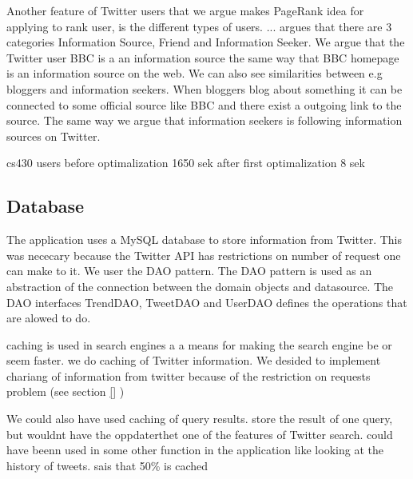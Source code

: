 Another feature of Twitter users that we argue makes PageRank idea for applying to rank user, is the different types of users.  ... argues that there are 3 categories Information Source, Friend and Information Seeker. We argue that the Twitter user BBC is a an information source the same way that BBC homepage is an information source on the web. We can also see similarities between e.g bloggers and information seekers. When bloggers blog about something it can be connected to some official source like BBC and there exist a outgoing link to the source. The same way we argue that information seekers is following information sources on Twitter.


cs430 users 
before optimalization
1650 sek
after first optimalization
8 sek

\subsection{Database} %
\label{feedJamDatabase}
The application uses a MySQL database to store information from Twitter. This was nececary because the Twitter API has restrictions on number of request one can make to it.
We user the DAO pattern. The DAO pattern is used as an abstraction of the connection between the domain objects and datasource. The DAO interfaces TrendDAO, TweetDAO and UserDAO defines the operations that are alowed to do.  


\citep{boka kap11} caching is used in search engines a a means for making the search engine be or seem faster. we do caching of Twitter information. We desided to implement chariang of information from twitter because of the restriction on requests problem (see section \ref{} \nameref{}) 

We could also have used caching of query results. store the result of one query, but wouldnt have the oppdaterthet %
one of the features of Twitter search. could have beenn used in some other function in the application like looking at the history of tweets. \citet{boka kap 11, under caching} sais that 50\% is cached



